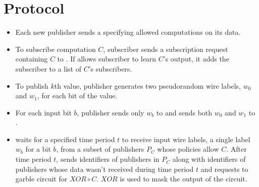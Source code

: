 \section{Protocol}
\label{sec:protocol}



\begin{figure*}[h]
\begin{mdframed}[style=myframe]


\initialize
\begin{itemize}[leftmargin=*]
 
	\item Each new publisher sends \broker a \policy specifying allowed
		computations on its data.

\end{itemize}

\subscribe
\begin{itemize}[leftmargin=*]

	\item To subscribe computation $C$, subscriber sends a subscription request
		containing $C$ to \broker. If \broker allows subscriber to learn $C$'s
		output, it adds the subscriber to a list of $C$'s subscribers. 

\end{itemize}

\publish
\begin{itemize}[leftmargin=*]
		
	\item To publish $k$th value, publisher generates two pseudorandom wire
		labels, $w_0$ and $w_1$, for each bit of the value. 
		
	\item For each input bit $b$, publisher sends only $w_b$ to \broker and sends
		both $w_0$ and $w_1$ to \garbler.

\end{itemize}

\process
\begin{itemize}[leftmargin=*]

	\item \broker waits for a specified time period $t$ to receive input wire
		labels, a single label $w_b$ for a bit $b$, from a subset of publishers
		$P_C$ whose policies allow $C$. After time period $t$, \broker sends
		\garbler identifiers of publishers in $P_C$ along with identifiers of
		publishers whose data wasn't received during time period $t$ and requests
		\garbler to garble circuit for $XOR \circ C$. $XOR$ is used to mask the
		output of the circuit.


\end{itemize}
\end{mdframed}
\end{figure*}
